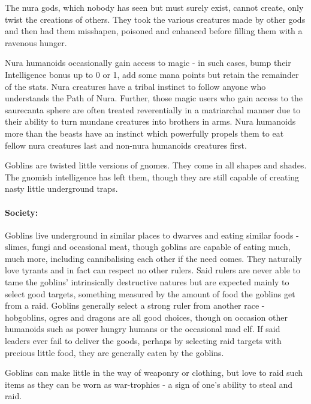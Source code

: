 \begin{multicols}{2}

The nura gods, which nobody has seen but must surely exist, cannot create, only twist the creations of others.  They took the various creatures made by other gods and then had them misshapen, poisoned and enhanced before filling them with a ravenous hunger.

Nura humanoids occasionally gain access to magic - in such cases, bump their Intelligence bonus up to 0 or 1, add some mana points but retain the remainder of the stats.  Nura creatures have a tribal instinct to follow anyone who understands the Path of Nura.  Further, those magic users who gain access to the saurecanta sphere are often treated reverentially in a matriarchal manner due to their ability to turn mundane creatures into brothers in arms.  Nura humanoids more than the beasts have an instinct which powerfully propels them to eat fellow nura creatures last and non-nura humanoids creatures first.

\label{goblin}
\goblin

Goblins are twisted little versions of gnomes.  They come in all shapes and shades.  The gnomish intelligence has left them, though they are still capable of creating nasty little underground traps.

\paragraph{Society:} Goblins live underground in similar places to dwarves and eating similar foods - slimes, fungi and occasional meat, though goblins are capable of eating much, much more, including cannibalising each other if the need comes.  They naturally love tyrants and in fact can respect no other rulers.  Said rulers are never able to tame the goblins' intrinsically destructive natures but are expected mainly to select good targets, something measured by the amount of food the goblins get from a raid.  Goblins generally select a strong ruler from another race - hobgoblins, ogres and dragons are all good choices, though on occasion other humanoids such as power hungry humans or the occasional mad elf.  If said leaders ever fail to deliver the goods, perhaps by selecting raid targets with precious little food, they are generally eaten by the goblins.

	Goblins can make little in the way of weaponry or clothing, but love to raid such items as they can be worn as war-trophies - a sign of one's ability to steal and raid.


\end{multicols}
